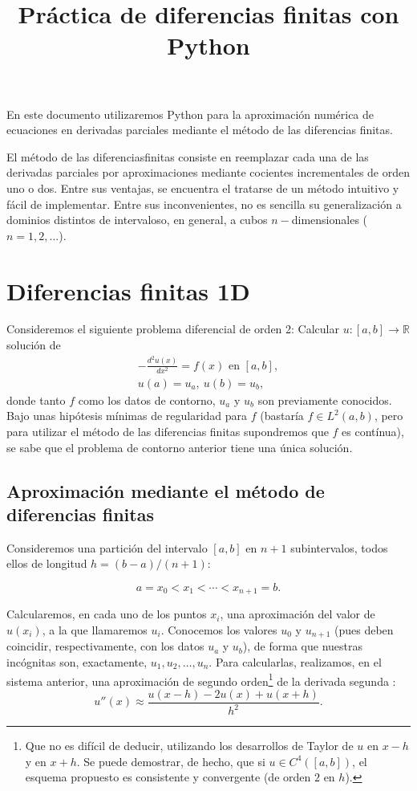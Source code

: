 \documentclass[11pt,spanish,a4wide]{article}
\title{Práctica de diferencias finitas con Python}
\def\Rset{\mathbb{R}}
\newcommand{\en}{\mbox{\ en \ }}
\begin{document}
  En este documento utilizaremos Python para  la
  aproximación numérica de ecuaciones en derivadas parciales mediante
  el método de las diferencias finitas.

El método de las diferenciasfinitas consiste en reemplazar cada una de
las derivadas parciales por aproximaciones mediante cocientes
incrementales de orden uno o dos. Entre sus ventajas, se encuentra el
tratarse de un método intuitivo y fácil de implementar. Entre sus
inconvenientes, no es sencilla su generalización a dominios distintos
de intervaloso, en general, a cubos $n-$dimensionales ($n=1,2,...$).

\section{Diferencias finitas 1D}
Consideremos el siguiente problema diferencial de orden 2:
Calcular $u:[a,b] \to  \Rset$ solución de
\begin{align}
  \label{pb1d}
  -\frac{d^2 u(x) }{dx^2} = f(x) \en [a,b], \\
  u(a)=u_a, \ u(b)=u_b,
\end{align}
donde tanto $f$ como los datos de contorno, $u_a$ y $u_b$ son
previamente conocidos. Bajo unas hipótesis mínimas de regularidad para
$f$ (bastaría $f\in L^2(a,b)$, pero para utilizar el método de las
diferencias finitas supondremos que $f$ es contínua), se sabe que el
problema de contorno anterior tiene una única solución.

\subsection{Aproximación mediante el método de diferencias finitas}
\label{sec:diferencias-finitas-dim-1}
Consideremos una partición del intervalo $[a,b]$ en $n+1$
subintervalos, todos ellos de longitud $h=(b-a)/(n+1)$:

$$
a=x_0 < x_1 < \cdots < x_{n+1} = b.
$$

Calcularemos, en cada uno de los puntos $x_i$, una aproximación del
valor de $u(x_i)$, a la que llamaremos $u_i$. Conocemos los valores $u_0$ y
$u_{n+1}$ (pues deben coincidir, respectivamente, con los datos $u_a$
y $u_b$), de forma que nuestras incógnitas son, exactamente, $u_1,
u_2,\dots,u_n$. Para calcularlas, realizamos, en el sistema anterior,
una aproximación de segundo orden\footnote{Que no es difícil de
  deducir, utilizando los desarrollos de Taylor de $u$ en
$x-h$ y en $x+h$. Se puede demostrar, de hecho, que si $u \in
C^4([a,b])$, el esquema propuesto es  consistente
y convergente (de orden $2$ en $h$).} de la derivada segunda 
:
$$
u''(x) \approx \frac{u(x-h)-2u(x)+u(x+h)}{h^2}.
$$
\end{document}
